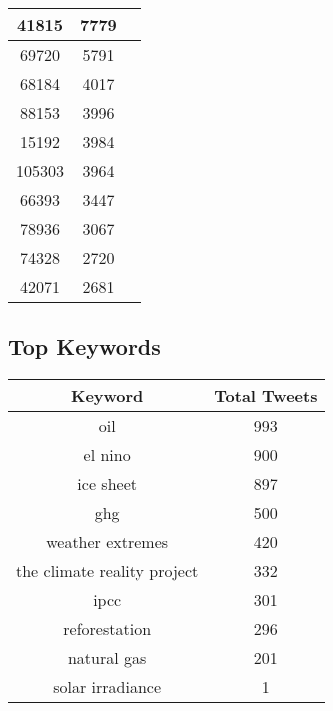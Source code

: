 \documentclass{article}\usepackage[T1]{fontenc}
\begin{document}
\begin{tabular}{|c|c|c|}
 \hline
41815 & 7779\\ 
 \hline
69720 & 5791\\ 
 \hline
68184 & 4017\\ 
 \hline
88153 & 3996\\ 
 \hline
15192 & 3984\\ 
 \hline
105303 & 3964\\ 
 \hline
66393 & 3447\\ 
 \hline
78936 & 3067\\ 
 \hline
74328 & 2720\\ 
 \hline
42071 & 2681\\ 
 \hline
\end{tabular}\subsection*{Top Keywords}\begin{tabular}{|c|c|}         \hline         Keyword & Total Tweets \\ 
 \hline
oil & 993\\ 
 \hline
el nino & 900\\ 
 \hline
ice sheet & 897\\ 
 \hline
ghg & 500\\ 
 \hline
weather extremes & 420\\ 
 \hline
the climate reality project & 332\\ 
 \hline
ipcc & 301\\ 
 \hline
reforestation & 296\\ 
 \hline
natural gas & 201\\ 
 \hline
solar irradiance & 1\\ 
 \hline
\end{tabular}
\end{document}

